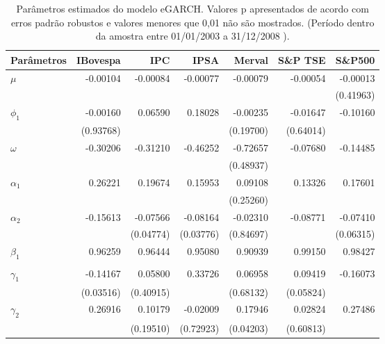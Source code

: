 \begin{table}[H]
\centering
\caption{Par\^ametros estimados do modelo eGARCH. Valores p apresentados de acordo 
com erros padrão robustos e valores menores que 0,01 não são mostrados. (Período 
dentro da amostra entre 01/01/2003 a 31/12/2008 ).} 
\label{tab:garchcoef}
\begin{tabular}{lrrrrrr}
  \hline
Parâmetros & IBovespa & IPC & IPSA & Merval & S\&P TSE & S\&P500 \\ 
  \hline
$\mu$ & -0.00104 & -0.00084 & -0.00077 & -0.00079 & -0.00054 & -0.00013 \\ 
   &  &  &  &  &  & (0.41963) \\ 
  $\phi_1$ & -0.00160 & 0.06590 & 0.18028 & -0.00235 & -0.01647 & -0.10160 \\ 
   & (0.93768) &  &  & (0.19700) & (0.64014) &  \\ 
  $\omega$ & -0.30206 & -0.31210 & -0.46252 & -0.72657 & -0.07680 & -0.14485 \\ 
   &  &  &  & (0.48937) &  &  \\ 
  $\alpha_1$ & 0.26221 & 0.19674 & 0.15953 & 0.09108 & 0.13326 & 0.17601 \\ 
   &  &  &  & (0.25260) &  &  \\ 
  $\alpha_2$ & -0.15613 & -0.07566 & -0.08164 & -0.02310 & -0.08771 & -0.07410 \\ 
   &  & (0.04774) & (0.03776) & (0.84697) &  & (0.06315) \\ 
  $\beta_1$ & 0.96259 & 0.96444 & 0.95080 & 0.90939 & 0.99150 & 0.98427 \\ 
   &  &  &  &  &  &  \\ 
  $\gamma_1$ & -0.14167 & 0.05800 & 0.33726 & 0.06958 & 0.09419 & -0.16073 \\ 
   & (0.03516) & (0.40915) &  & (0.68132) & (0.05824) &  \\ 
  $\gamma_2$ & 0.26916 & 0.10179 & -0.02009 & 0.17946 & 0.02824 & 0.27486 \\ 
   &  & (0.19510) & (0.72923) & (0.04203) & (0.60813) &  \\ 
   \hline
\end{tabular}
\end{table}
